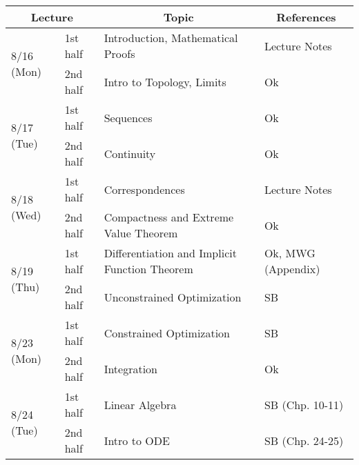 \documentclass[11pt]{article}
\begin{document}
\begin{tabularx}{\columnwidth}{llll}
  \toprule
  \multicolumn{2}{c}{Lecture}
  &
  \multicolumn{1}{c}{Topic}
  &
  \multicolumn{1}{c}{References}
  \\\midrule
  \multirow{2}{*}{8/16 (Mon)} & 1st half & Introduction, Mathematical Proofs             & Lecture Notes      \\
                              & 2nd half & Intro to Topology, Limits                     & Ok                 \\[6pt]
  \multirow{2}{*}{8/17 (Tue)} & 1st half & Sequences                                     & Ok                 \\
                              & 2nd half & Continuity                                    & Ok                 \\[6pt]
  \multirow{2}{*}{8/18 (Wed)} & 1st half & Correspondences                               & Lecture Notes      \\
                              & 2nd half & Compactness and Extreme Value Theorem         & Ok                 \\[6pt]
  \multirow{2}{*}{8/19 (Thu)} & 1st half & Differentiation and Implicit Function Theorem & Ok, MWG (Appendix) \\
                              & 2nd half & Unconstrained Optimization                    & SB                 \\[6pt]
  \multirow{2}{*}{8/23 (Mon)} & 1st half & Constrained Optimization                      & SB                 \\
                              & 2nd half & Integration                                   & Ok                 \\[6pt]
  \multirow{2}{*}{8/24 (Tue)} & 1st half & Linear Algebra                                & SB (Chp. 10-11)    \\
                              & 2nd half & Intro to ODE                                  & SB (Chp. 24-25)    \\
  \bottomrule
\end{tabularx}


\end{document}
